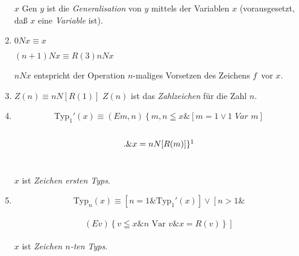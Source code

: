 \documentclass[draft]{scrartcl}
\begin{document}
\begin{enumerate}[1.]
	$x \text{ Gen } y$ ist die \textit{Generalisation} von $y$ mittels der Variablen $x$ (vorausgesetzt, daß $x$ eine \textit{Variable} ist).

	\item {}$0 N x \equiv x$

	$\left(n + 1\right) N x \equiv R\left(3\right) n N x$%

	$n N x$ entspricht der Operation \glqq$n$-maliges
	Vorsetzen des Zeichens \glq$f$\grq\ vor $x$\grqq.

	\item {}$Z\left(n\right) \equiv n N\left[R\left(1\right)\right]$%
	$Z\left(n\right)$ ist das \textit{Zahlzeichen} für die Zahl $n$.

	\let\originalfootnote=\thefootnote
	\let\thefootnote=\fnvierunddreissigb

	\item {}$$
		\text{Typ}_1'\left(x\right) \equiv \left(Em, n\right) \left\{m, n\leqq x \& \left[m = 1 \lor 1\textit{ Var } m\right] \right.
	$$\\[\spacebetweenbreakedequations]
	$$\left.\& x = n N \left[R\left(m\right)\right]\right\}
\footnote{$m, n \leqq x$ steht für: $m \leqq x \& n \leqq x$ (ebenso für mehr als 2 Variable).}$$\\[\spaceafterbreakedequation]%
	\let\thefootnote=\originalfootnote
	\setcounter{footnote}{34}

	$x$ ist \textit{Zeichen ersten Typs}.

	\item {}$$\text{Typ}_n\left(x\right) \equiv \left[n = 1 \& \text{Typ}_1'\left(x\right)\right] \lor \left[n > 1 \& \right.
	$$\\[\spacebetweenbreakedequations]
	$$\left.\left(Ev\right) \left\{v \leqq x \& n\text{ Var } v \& x = R\left(v\right)\right\}\right]$$\\[\spaceafterbreakedequation]

	$x$ ist \textit{Zeichen $n$-ten Typs}.


\end{enumerate}
\end{document}
